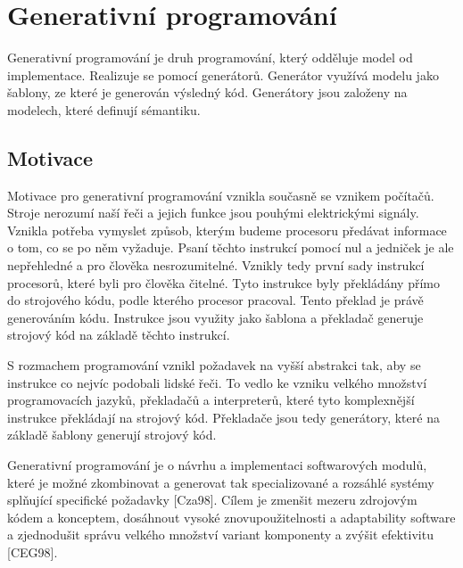 \chapter{Generativní programování}
Generativní programování je druh programování, který odděluje model od implementace. Realizuje se pomocí generátorů. Generátor využívá modelu jako šablony, ze které je generován výsledný kód. Generátory jsou založeny na modelech, které definují sémantiku. 

\section{Motivace}
Motivace pro generativní programování vznikla současně se vznikem počítačů. Stroje nerozumí naší řeči a jejich funkce jsou pouhými elektrickými signály. Vznikla potřeba vymyslet způsob, kterým budeme procesoru předávat informace o tom, co se po něm vyžaduje. Psaní těchto instrukcí pomocí nul a jedniček je ale nepřehledné a pro člověka nesrozumitelné. Vznikly tedy první sady instrukcí procesorů, které byli pro člověka čitelné. Tyto instrukce byly překládány přímo do strojového kódu, podle kterého procesor pracoval. Tento překlad je právě generováním kódu. Instrukce jsou využity jako šablona a překladač generuje strojový kód na základě těchto instrukcí.

S rozmachem programování vznikl požadavek na vyšší abstrakci tak, aby se instrukce co nejvíc podobali lidské řeči. To vedlo ke vzniku velkého množství programovacích jazyků, překladačů a interpreterů, které tyto komplexnější instrukce překládají na strojový kód. Překladače jsou tedy generátory, které na základě šablony generují strojový kód. 

Generativní programování je o návrhu a implementaci softwarových modulů, které je možné zkombinovat a generovat tak specializované a rozsáhlé systémy splňující specifické požadavky [Cza98]. Cílem je zmenšit mezeru zdrojovým kódem a konceptem, dosáhnout vysoké znovupoužitelnosti a adaptability software a zjednodušit správu velkého množství variant komponenty a zvýšit efektivitu [CEG98].


